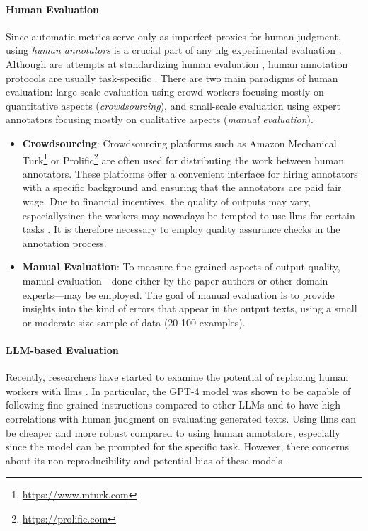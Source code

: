 \paragraph{Human Evaluation} Since automatic metrics serve only as imperfect proxies for human judgment, using \emph{human annotators} is a crucial part of any \ac{nlg} experimental evaluation \cite{gehrmannRepairingCrackedFoundation2022}. Although are attempts at standardizing human evaluation \cite{thomsonGoldStandardMethodology2020}, human annotation protocols are usually task-specific \cite{van2019best,belzDisentanglingPropertiesHuman2020}. There are two main paradigms of human evaluation: large-scale evaluation using crowd workers focusing mostly on quantitative aspects (\emph{crowdsourcing}), and small-scale evaluation using expert annotators focusing mostly on qualitative aspects (\emph{manual evaluation}).

\begin{itemize}
    \item \textbf{Crowdsourcing}: Crowdsourcing platforms such as Amazon Mechanical Turk\footnote{\url{https://www.mturk.com}} or Prolific\footnote{\url{https://prolific.com}} are often used for distributing the work between human annotators. These platforms offer a convenient interface for hiring annotators with a specific background and ensuring that the annotators are paid fair wage. Due to financial incentives, the quality of outputs may vary, especiallysince the workers may nowadays be tempted to use \acp{llm} for certain tasks \cite{veselovskyArtificialArtificialArtificial2023}. It is therefore necessary to employ quality assurance checks in the annotation process.
    \item \textbf{Manual Evaluation}: To measure fine-grained aspects of output quality, manual evaluation---done either by the paper authors or other domain experts---may be employed. The goal of manual evaluation is to provide insights into the kind of errors that appear in the output texts, using a small or moderate-size sample of data (20-100 examples).
\end{itemize}


\paragraph{LLM-based Evaluation} Recently, researchers have started to examine the potential of replacing human workers with \acp{llm} \cite{zhaoInvestigatingTabletoTextGeneration2023,sottanaEvaluationMetricsEra2023,kocmiLargeLanguageModels2023,chiang-lee-2023-large,wangChatGPTGoodNLG2023a,fu2023gptscore}. In particular, the GPT-4 model \cite{openai2023gpt4} was shown to be capable of following fine-grained instructions compared to other LLMs and to have high correlations with human judgment on evaluating generated texts. Using \acp{llm} can be cheaper and more robust compared to using human annotators, especially since the model can be prompted for the specific task. However, there concerns about its non-reproducibility \cite{kocmiGEMBAMQMDetectingTranslation2023} and potential bias of these models \cite{wangLargeLanguageModels2023}.
